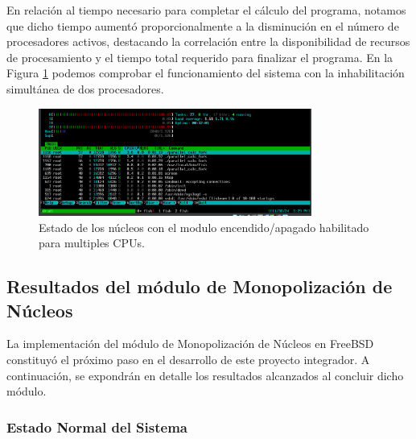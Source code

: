 En relación al tiempo necesario para completar el cálculo del programa, notamos que dicho tiempo aumentó proporcionalmente a la disminución en el número de procesadores activos, destacando la correlación entre la disponibilidad de recursos de procesamiento y el tiempo total requerido para finalizar el programa. En la Figura \ref{fig:cpuOnOff-result-2cpu} podemos comprobar el funcionamiento del sistema con la inhabilitación simultánea de dos procesadores.\par

\begin{figure}[H]
    \centering
    \includegraphics[width=0.8\textwidth]{images/cpuOnOff-result-2CPU.png}
    \caption{Estado de los núcleos con el modulo encendido/apagado habilitado para multiples CPUs.}
    \label{fig:cpuOnOff-result-2cpu}
\end{figure}




\subsection{Resultados del módulo de Monopolización de Núcleos}

La implementación del módulo de Monopolización de Núcleos en FreeBSD constituyó el próximo paso en el desarrollo de este proyecto integrador. A continuación, se expondrán en detalle los resultados alcanzados al concluir dicho módulo.\par

\subsubsection{Estado Normal del Sistema}

